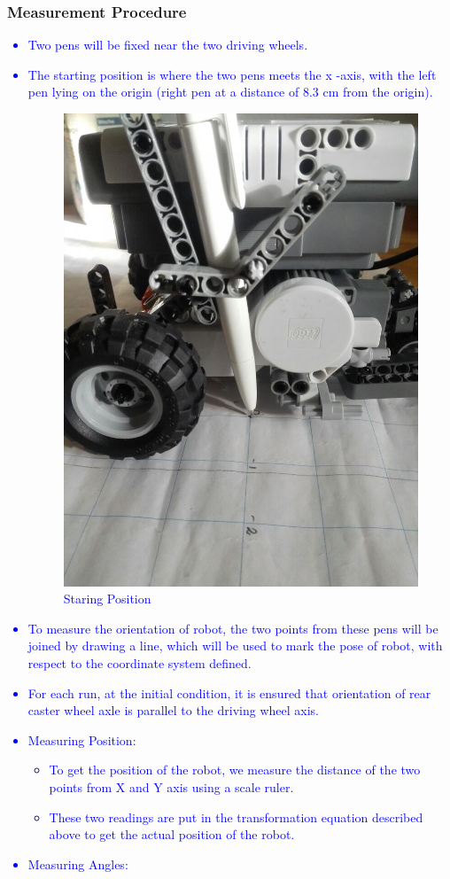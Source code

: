 \documentclass[10pt,a4paper]{article}
\begin{document}
		\subsubsection{Measurement Procedure} \textcolor{blue}{
		\begin{itemize}
			\item Two pens will be fixed near the two driving wheels.
			\item The starting position is where the two pens meets the x -axis, with the left pen lying on the origin (right pen at a distance of  8.3 cm from the origin).			
			\begin{figure}[h]
				\centering
				\includegraphics[width=0.4\linewidth]{img/starting-pt.jpeg}
				\caption{Staring Position}
				\label{fig:startingView}
			\end{figure}
			\item To measure the orientation of robot, the two points from these pens will be joined by drawing a line, which will be used to mark the pose of robot, with respect to the coordinate system defined.
			\item For each run, at the initial condition, it is ensured that orientation of rear caster wheel axle is parallel to the driving wheel axis.
			\item Measuring Position:
				\begin{itemize}
					\item To get the position of the robot, we measure the distance of the two points from X and Y axis using a scale ruler.
					\item These two readings are put in the transformation equation described above to get the actual position of the robot.
				\end{itemize}
			\item Measuring Angles:
				\begin{itemize}

\end{itemize}
\end{itemize}}
\end{document}
